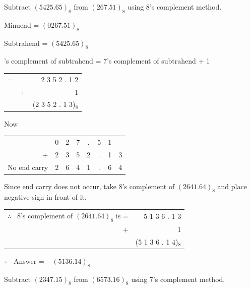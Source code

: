 \eject

\begin{problem}\label{prob5.35}
Subtract $(5425.65)_{8}$ from $(267.51)_{8}$ using 8's complement method.
\end{problem}

\begin{solution}
Minuend = $(0267.51)_{8}$

\qquad\!Subtrahend = $(5425.65)_{8}$

's complement of subtrahend = 7's complement of subtrahend + 1


\medskip
\begin{tabular}{@{\hspace{4.75cm}}rrr}
 = && 2 3 5 2 . 1 2\\
   & + & 1\\
\cline{2-3}
 & & (2 3 5 2 . 1 3)$_{8}$\!\!\!\!\!
\end{tabular}

\smallskip
Now
\begin{center}
\begin{tabular}{rccccccc}
 & 0 & 2 & 7 & . & 5 & 1\\[3pt]
+ & 2 & 3 & 5 & 2 & . & 1 & 3\\
\cline{2-8}
No end carry & 2 & 6 & 4 & 1 & . & 6 & 4
\end{tabular}
\end{center}
Since end carry does not occur, take 8's complement of $(2641.64)_{8}$ and place negative sign in front of it.

\medskip
\begin{tabular}{rr}
$\therefore$~ 8's complement of $(2641.64)_{8}$ is = & 5  1  3  6 . 1  3\\
 + & 1\\
\cline{2-2}
 & (5 1 3 6 . 1 4)$_{8}$\!\!\!\!
\end{tabular}
\smallskip

$\therefore$~ Answer = $-(5136.14)_{8}$
\end{solution}

\begin{problem}\label{prob5.36}
Subtract $(2347.15)_{8}$ from $(6573.16)_{8}$ using 7's complement method.
\end{problem}

